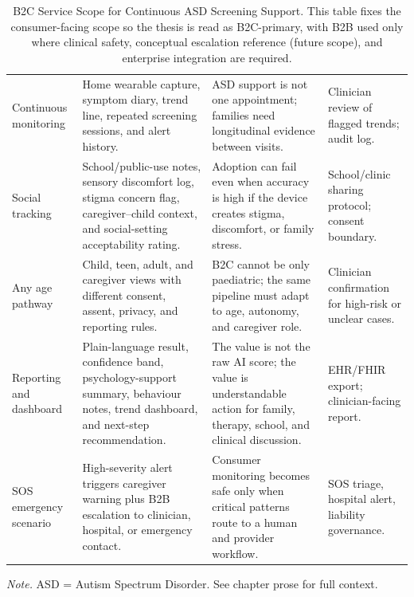 {\tablestripes\tablefontsize
{}
\begin{xltabular}{\textwidth}{@{} >{\raggedright\arraybackslash}p{2.0cm} p{4.7cm} p{4.4cm} >{\raggedright\arraybackslash}p{3.1cm} @{}}
\caption[B2C Service Scope for Continuous ASD Screening Support]{B2C Service Scope for Continuous ASD Screening Support. This table fixes the consumer-facing scope so the thesis is read as B2C-primary, with B2B used only where clinical safety, conceptual escalation reference (future scope), and enterprise integration are required.}\label{tab:b2c_service_scope} \\
\toprule
{} &  &  &  \\
\midrule
\endfirsthead
\endhead
\bottomrule
\endlastfoot
Continuous monitoring & Home wearable capture, symptom diary, trend line, repeated screening sessions, and alert history. & ASD support is not one appointment; families need longitudinal evidence between visits. & Clinician review of flagged trends; audit log. \\
\addlinespace
Social tracking & School/public-use notes, sensory discomfort log, stigma concern flag, caregiver--child context, and social-setting acceptability rating. & Adoption can fail even when accuracy is high if the device creates stigma, discomfort, or family stress. & School/clinic sharing protocol; consent boundary. \\
\addlinespace
Any age pathway & Child, teen, adult, and caregiver views with different consent, assent, privacy, and reporting rules. & B2C cannot be only paediatric; the same pipeline must adapt to age, autonomy, and caregiver role. & Clinician confirmation for high-risk or unclear cases. \\
\addlinespace
Reporting and dashboard & Plain-language result, confidence band, psychology-support summary, behaviour notes, trend dashboard, and next-step recommendation. & The value is not the raw AI score; the value is understandable action for family, therapy, school, and clinical discussion. & EHR/FHIR export; clinician-facing report. \\
\addlinespace
SOS emergency scenario & High-severity alert triggers caregiver warning plus B2B escalation to clinician, hospital, or emergency contact. & Consumer monitoring becomes safe only when critical patterns route to a human and provider workflow. & SOS triage, hospital alert, liability governance. \\
\end{xltabular}}
\vspace{0.3em}\noindent\textit{Note.} ASD = Autism Spectrum Disorder. See chapter prose for full context.


